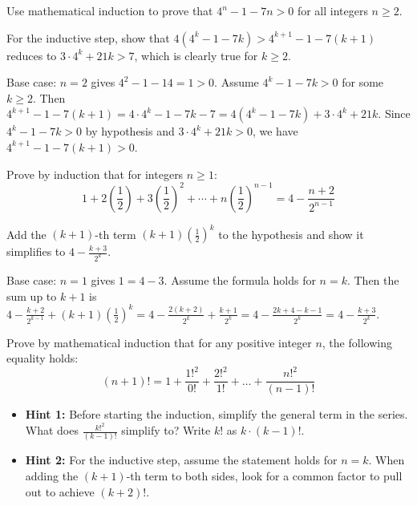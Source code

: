\begin{problem}
Use mathematical induction to prove that $4^n - 1 - 7n > 0$ for all integers $n \ge 2$.
\end{problem}

\begin{hint}
For the inductive step, show that $4(4^k - 1 - 7k) > 4^{k+1} - 1 - 7(k+1)$ reduces to $3 \cdot 4^k + 21k > 7$, which is clearly true for $k \ge 2$.
\end{hint}

\begin{solution}[Sketch]
Base case: $n=2$ gives $4^2 - 1 - 14 = 1 > 0$. Assume $4^k - 1 - 7k > 0$ for some $k \ge 2$. Then $4^{k+1} - 1 - 7(k+1) = 4 \cdot 4^k - 1 - 7k - 7 = 4(4^k - 1 - 7k) + 3 \cdot 4^k + 21k$. Since $4^k - 1 - 7k > 0$ by hypothesis and $3 \cdot 4^k + 21k > 0$, we have $4^{k+1} - 1 - 7(k+1) > 0$.
\end{solution}

\begin{problem}
Prove by induction that for integers $n \ge 1$:
\[1 + 2\left(\frac{1}{2}\right) + 3\left(\frac{1}{2}\right)^2 + \cdots + n\left(\frac{1}{2}\right)^{n-1} = 4 - \frac{n+2}{2^{n-1}}\]
\end{problem}

\begin{hint}
Add the $(k+1)$-th term $(k+1)\left(\frac{1}{2}\right)^k$ to the hypothesis and show it simplifies to $4 - \frac{k+3}{2^k}$.
\end{hint}

\begin{solution}[Sketch]
Base case: $n=1$ gives $1 = 4 - 3$. Assume the formula holds for $n=k$. Then the sum up to $k+1$ is $4 - \frac{k+2}{2^{k-1}} + (k+1)\left(\frac{1}{2}\right)^k = 4 - \frac{2(k+2)}{2^k} + \frac{k+1}{2^k} = 4 - \frac{2k+4-k-1}{2^k} = 4 - \frac{k+3}{2^k}$.
\end{solution}

\begin{problem}
Prove by mathematical induction that for any positive integer $n$, the following equality holds:
$$ (n+1)! = 1 + \frac{1!^2}{0!} + \frac{2!^2}{1!} + \dots + \frac{n!^2}{(n-1)!} $$
\end{problem}

\begin{hint}
\begin{itemize}
    \item \textbf{Hint 1:} Before starting the induction, simplify the general term in the series. What does $\frac{k!^2}{(k-1)!}$ simplify to? Write $k!$ as $k \cdot (k-1)!$.
    \item \textbf{Hint 2:} For the inductive step, assume the statement holds for $n=k$. When adding the $(k+1)$-th term to both sides, look for a common factor to pull out to achieve $(k+2)!$.
\end{itemize}
\end{hint}


